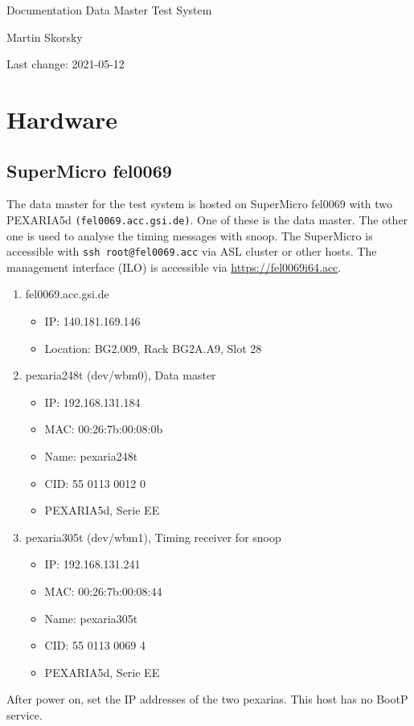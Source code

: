 \documentclass[12pt,a4paper]{report}
\begin{document}
\begin{titlepage}
\vspace{2cm}
\begin{center}
\Huge{Documentation Data Master Test System}

\Large{Martin Skorsky}

\Large{Last change: 2021-05-12}
\end{center}
\vfill
\end{titlepage}

\tableofcontents

\chapter{Hardware}
\section{SuperMicro fel0069}
The data master for the test system is hosted on SuperMicro fel0069 with two PEXARIA5d \texttt{(fel0069.acc.gsi.de)}.
One of these is the data master. The other one is used to analyse the timing messages with snoop.
The SuperMicro is accessible with \texttt{ssh root@fel0069.acc} via ASL cluster or other hosts.
The management interface (ILO) is accessible via \url{https://fel0069i64.acc}.
\begin{enumerate}
\item fel0069.acc.gsi.de
\begin{itemize}
\item IP: 140.181.169.146
\item Location: BG2.009, Rack BG2A.A9, Slot 28
\end{itemize}
\item pexaria248t (dev/wbm0), Data master
\begin{itemize}
\item IP: 192.168.131.184
\item MAC: 00:26:7b:00:08:0b
\item Name: pexaria248t
\item CID: 55 0113 0012 0
\item PEXARIA5d, Serie EE
\end{itemize}
\item pexaria305t (dev/wbm1), Timing receiver for snoop
\begin{itemize}
\item IP: 192.168.131.241
\item MAC: 00:26:7b:00:08:44
\item Name: pexaria305t
\item CID: 55 0113 0069 4
\item PEXARIA5d, Serie EE
\end{itemize}
\end{enumerate}
After power on, set the IP addresses of the two pexarias. This host has no BootP service.
\end{document}

